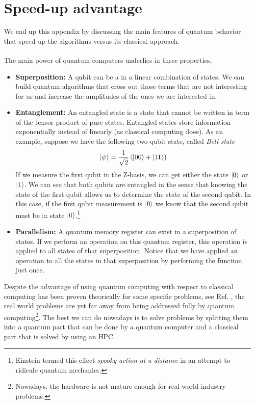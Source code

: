 \section{Speed-up advantage}
We end up this appendix by discussing the main features of quantum behavior that speed-up the algorithms versus its classical approach.\\\\
The main power of quantum computers underlies in three properties,
\begin{itemize}
    \item \textbf{Superposition:} A qubit can be a in a linear combination of states. We can build quantum algorithms that cross out those terms that are not interesting for us and increase the amplitudes of the ones we are interested in.
    \item \textbf{Entanglement:} An entangled state is a state that cannot be written in term of the tensor product of pure states. Entangled states store information exponentially instead of linearly (as classical computing does). As an example, suppose we have the following two-qubit state, called \textit{Bell state}
\begin{equation}
    \ket{\psi} = \frac{1}{\sqrt{2}}\left(\ket{00} + \ket{11}\right)
\end{equation}
If we measure the first qubit in the Z-basis, we can get either the state $\ket{0}$ or $\ket{1}$. We can see that both qubits are entangled in the sense that knowing the state of the first qubit allows us to determine the state of the second qubit. In this case, if the first qubit measurement is $\ket{0}$ we know that the second qubit must be in state $\ket{0}$.\footnote{Einstein termed this effect \emph{spooky action at a distance} in an attempt to ridicule quantum mechanics.}  
    \item \textbf{Parallelism:} A quantum memory register can exist in a superposition of states. If we perform an operation on this quantum register, this operation is applied to all states of that superposition. Notice that we have applied an operation to all the states in that superposition by performing the function just once.
\end{itemize}
Despite the advantage of using quantum computing with respect to classical computing has been proven theorically for some specific problems, see Ref. \cite{Grover19961996Search}, the real world problems are yet far away from being addressed fully by quantum computing\footnote{Nowadays, the hardware is not mature enough for real world industry problems.}. The best we can do nowadays is to solve problems by splitting them into a quantum part that can be done by a quantum computer and a classical part that is solved by using an HPC.
